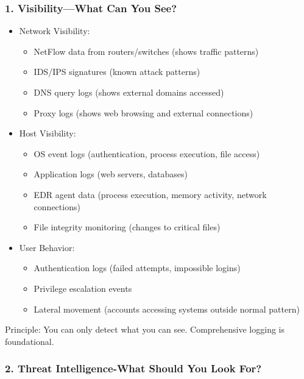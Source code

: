 \documentclass[10pt]{article}
\begin{document}
\subsubsection*{1. Visibility—What Can You See?}
\begin{itemize}
  \item Network Visibility:
  \begin{itemize}
  	\item NetFlow data from routers/switches (shows traffic patterns)
  	\item IDS/IPS signatures (known attack patterns)
  	\item DNS query logs (shows external domains accessed)
  	\item Proxy logs (shows web browsing and external connections)
  \end{itemize}
  \item Host Visibility:
  \begin{itemize}
  	\item OS event logs (authentication, process execution, file access)
  	\item Application logs (web servers, databases)
  	\item EDR agent data (process execution, memory activity, network connections)
  	\item File integrity monitoring (changes to critical files)
  \end{itemize}
  \item User Behavior:
  \begin{itemize}
  	\item Authentication logs (failed attempts, impossible logins)
  	\item Privilege escalation events
  	\item Lateral movement (accounts accessing systems outside normal pattern)
  \end{itemize}
\end{itemize}

Principle: You can only detect what you can see. Comprehensive logging is foundational.
\subsubsection*{2. Threat Intelligence-What Should You Look For?}
\end{document}

